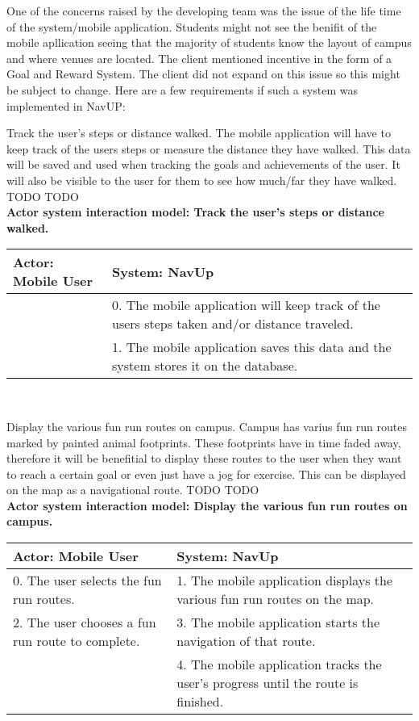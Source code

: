One of the concerns raised by the developing team was the issue of the life time of the system/mobile application. Students might not see the benifit of the mobile apllication seeing that the majority of students know the layout of campus and where venues are located. The client mentioned incentive in the form of a Goal and Reward System. The client did not expand on this issue so this might be subject to change. Here are a few requirements if such a system was implemented in NavUP:

\FuncReq
{Track the user's steps or distance walked.}
{The mobile application will have to keep track of the users steps or measure the distance they have walked. This data will be saved and used when tracking the goals and achievements of the user. It will also be visible to the user for them to see how much/far they have walked.}
{TODO}
{TODO}
\\
\textbf{Actor system interaction model: Track the user's steps or distance walked.}\\
\begin{tabular}{ | p{6cm} | p{6cm} |}
\hline
Actor: Mobile User & System: NavUp \\ \hline
& 0. The mobile application will keep track of the users steps taken and/or distance traveled.\\ \hline
& 1. The mobile application saves this data and the system stores it on the database.\\ \hline
\end{tabular}
\\
\bigskip

\FuncReq
{Display the various fun run routes on campus.}
{Campus has varius fun run routes marked by painted animal footprints. These footprints have in time faded away, therefore it will be benefitial to display these routes to the user when they want to reach a certain goal or even just have a jog for exercise. This can be displayed on the map as a navigational route.}
{TODO}
{TODO}
\\
\textbf{Actor system interaction model: Display the various fun run routes on campus.}\\
\begin{tabular}{ | p{6cm} | p{6cm} |}
\hline
Actor: Mobile User & System: NavUp \\ \hline
0. The user selects the fun run routes. & 1. The mobile application displays the various fun run routes on the map.\\ \hline
2. The user chooses a fun run route to complete. & 3. The mobile application starts the navigation of that route.\\ \hline
& 4. The mobile application tracks the user's progress until the route is finished.\\ \hline
\end{tabular}
\\
\bigskip

